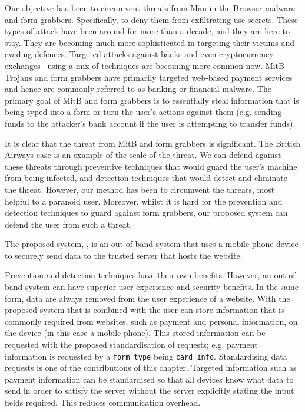 Our objective has been to circumvent threats from Man-in-the-Browser malware and form grabbers. Specifically, to deny them from exfiltrating use secrets. These types of attack have been around for more than a decade, and they are here to stay. They are becoming much more sophisticated in targeting their victims and evading defences. Targeted attacks against banks and even cryptocurrency exchanges~\cite{moshailov_gozi_2019} using a mix of techniques are becoming more common now. MitB Trojans and form grabbers have primarily targeted web-based payment services and hence are commonly referred to as banking or financial malware. The primary goal of MitB and form grabbers is to essentially steal information that is being typed into a form or turn the user's actions against them (e.g. sending funds to the attacker's bank account if the user is attempting to transfer funds).

It is clear that the threat from MitB and form grabbers is significant. The British Airways case is an example of the scale of the threat. We can defend against these threats through preventive techniques that would guard the user's machine from being infected, and detection techniques that would detect and eliminate the threat. However, our method has been to circumvent the threats, most helpful to a paranoid user. Moreover, whilst it is hard for the prevention and detection techniques to guard against form grabbers, our proposed system can defend the user from such a threat.

The proposed system, \formless, is an out-of-band system that uses a mobile phone device to securely send data to the trusted server that hosts the website.

Prevention and detection techniques have their own benefits. However, an out-of-band system can have superior user experience and security benefits. In the same form, data are always removed from the user experience of a website. With the proposed system that is combined with \deeid the user can store information that is commonly required from websites, such as payment and personal information, on the device (in this case a mobile phone). This stored information can be requested with the proposed standardisation of requests; e.g. payment information is requested by a \texttt{form\_type} being \texttt{card\_info}. Standardising data requests is one of the contributions of this chapter. Targeted information such as payment information can be standardised so that all devices know what data to send in order to satisfy the server without the server explicitly stating the input fields required. This reduces communication overhead.

